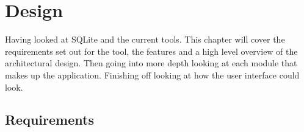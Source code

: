 %
%
%
%
%
%

\section{Design}
\label{sec:design}

Having looked at SQLite and the current tools. This chapter will cover the requirements set out for the tool, the features and a high level overview of the architectural design.  Then going into more depth looking at each module that makes up the application. Finishing off looking at how the user interface could look.

\subsection{Requirements}
\label{subsec:requirements}

